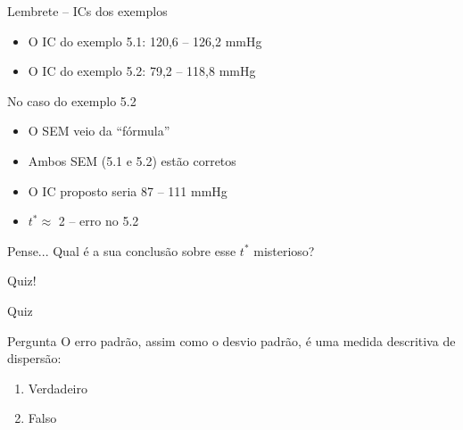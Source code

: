 \documentclass{beamer}
\begin{document}
\begin{frame}{\scriptsize }
  \begin{exampleblock}{Lembrete -- ICs dos exemplos}
    \footnotesize
    \begin{itemize}
      \footnotesize
    \item O IC do exemplo 5.1: 120,6 -- 126,2 mmHg
    \item O IC do exemplo 5.2: \alert{79,2 -- 118,8 mmHg}
    \end{itemize}
  \end{exampleblock}
  \begin{block}{No caso do exemplo 5.2}
    \footnotesize
    \begin{itemize}
      \footnotesize
    \item O SEM veio da ``fórmula''
    \item Ambos SEM (5.1 e 5.2) estão corretos
    \item O IC proposto seria \alert{87 -- 111 mmHg}
    \item $t^{*} \approx$ 2 -- erro no 5.2
    \end{itemize}
  \end{block}
  \begin{block}{Pense...}
    \footnotesize
    Qual é a sua conclusão sobre esse $t^{*}$ misterioso?
  \end{block}
\end{frame}

\begin{frame}
  \begin{center}
    \LARGE
    Quiz!
  \end{center}
\end{frame}

\begin{frame}{\scriptsize Quiz}
  \begin{block}{Pergunta}
    \footnotesize
    O erro padrão, assim como o desvio padrão, é uma medida descritiva de dispersão:

    \bigskip
    \begin{enumerate}
      \scriptsize
    \item Verdadeiro
    \item \alert<2>{Falso}
    \end{enumerate}
  \end{block}
\end{frame}
\end{document}
